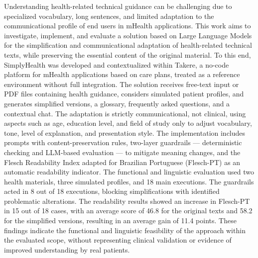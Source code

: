 \begin{translatedabstract}
Understanding health-related technical guidance can be challenging due to specialized vocabulary, long sentences, and limited adaptation to the communicational profile of end users in mHealth applications. This work aims to investigate, implement, and evaluate a solution based on Large Language Models for the simplification and communicational adaptation of health-related technical texts, while preserving the essential content of the original material. To this end, SimplyHealth was developed and contextualized within Takere, a no-code platform for mHealth applications based on care plans, treated as a reference environment without full integration. The solution receives free-text input or PDF files containing health guidance, considers simulated patient profiles, and generates simplified versions, a glossary, frequently asked questions, and a contextual chat. The adaptation is strictly communicational, not clinical, using aspects such as age, education level, and field of study only to adjust vocabulary, tone, level of explanation, and presentation style. The implementation includes prompts with content-preservation rules, two-layer guardrails — deterministic checking and LLM-based evaluation — to mitigate meaning changes, and the Flesch Readability Index adapted for Brazilian Portuguese (Flesch-PT) as an automatic readability indicator. The functional and linguistic evaluation used two health materials, three simulated profiles, and 18 main executions. The guardrails acted in 8 out of 18 executions, blocking simplifications with identified problematic alterations. The readability results showed an increase in Flesch-PT in 15 out of 18 cases, with an average score of 46.8 for the original texts and 58.2 for the simplified versions, resulting in an average gain of 11.4 points. These findings indicate the functional and linguistic feasibility of the approach within the evaluated scope, without representing clinical validation or evidence of improved understanding by real patients.
\end{translatedabstract}
